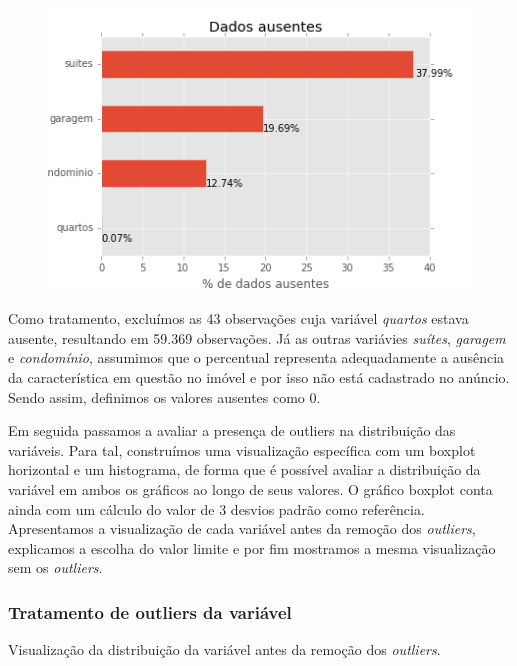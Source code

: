 \begin{figure}[th!]
\centering
\includegraphics[width=0.8\linewidth]{img/var_intrins_ausente}
\caption[Percentual de valores ausentes]{}
\caption{}
\label{fig:var_intrins_ausente}
\end{figure}

Como tratamento, excluímos as 43 observações cuja variável \textit{quartos} estava ausente, resultando em 59.369 observações. Já as outras variávies    \textit{suítes}, \textit{garagem} e \textit{condomínio}, assumimos que o percentual representa adequadamente a ausência da característica em questão no imóvel e por isso não está cadastrado no anúncio. Sendo assim, definimos os valores ausentes como 0.

Em seguida passamos a avaliar a presença de outliers na distribuição das variáveis. Para tal, construímos uma visualização específica com um boxplot horizontal e um histograma, de forma que é possível avaliar a distribuição da variável em ambos os gráficos ao longo de seus valores. O gráfico boxplot conta ainda com um cálculo do valor de 3 desvios padrão como referência. Apresentamos a visualização de cada variável antes da remoção dos \textit{outliers}, explicamos a escolha do valor limite e por fim mostramos a mesma visualização sem os \textit{outliers}.

\subsubsection{Tratamento de outliers da variável }

Visualização da distribuição da variável  antes da remoção dos \textit{outliers}. 


